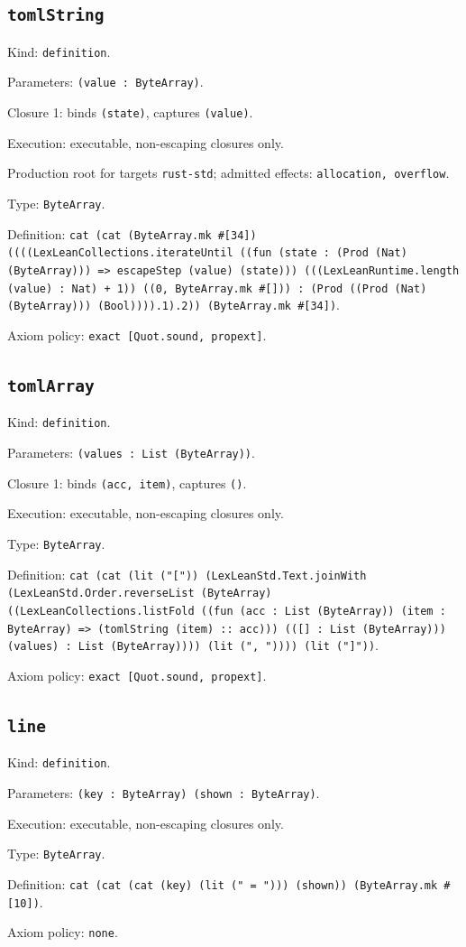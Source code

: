 \documentclass[11pt]{article}
\begin{document}
\subsection*{\texttt{tomlString}}
\noindent Kind: \texttt{definition}.\par
\noindent Parameters: \texttt{(value : ByteArray)}.\par
\noindent Closure 1: binds \texttt{(state)}, captures \texttt{(value)}.\par
\noindent Execution: executable, non-escaping closures only.\par
\noindent Production root for targets \texttt{rust-std}; admitted effects: \texttt{allocation, overflow}.\par
\noindent Type: \texttt{ByteArray}.\par
\noindent Definition: \texttt{cat (cat (ByteArray.mk \#[34]) ((((LexLeanCollections.iterateUntil ((fun (state : (Prod (Nat) (ByteArray))) => escapeStep (value) (state))) (((LexLeanRuntime.length (value) : Nat) + 1)) ((0, ByteArray.mk \#[])) : (Prod ((Prod (Nat) (ByteArray))) (Bool)))).1).2)) (ByteArray.mk \#[34])}.\par
\noindent Axiom policy: \texttt{exact [Quot.sound, propext]}.\par
\subsection*{\texttt{tomlArray}}
\noindent Kind: \texttt{definition}.\par
\noindent Parameters: \texttt{(values : List (ByteArray))}.\par
\noindent Closure 1: binds \texttt{(acc, item)}, captures \texttt{()}.\par
\noindent Execution: executable, non-escaping closures only.\par
\noindent Type: \texttt{ByteArray}.\par
\noindent Definition: \texttt{cat (cat (lit ("[")) (LexLeanStd.Text.joinWith (LexLeanStd.Order.reverseList (ByteArray) ((LexLeanCollections.listFold ((fun (acc : List (ByteArray)) (item : ByteArray) => (tomlString (item) :: acc))) (([] : List (ByteArray))) (values) : List (ByteArray)))) (lit (", ")))) (lit ("]"))}.\par
\noindent Axiom policy: \texttt{exact [Quot.sound, propext]}.\par
\subsection*{\texttt{line}}
\noindent Kind: \texttt{definition}.\par
\noindent Parameters: \texttt{(key : ByteArray) (shown : ByteArray)}.\par
\noindent Execution: executable, non-escaping closures only.\par
\noindent Type: \texttt{ByteArray}.\par
\noindent Definition: \texttt{cat (cat (cat (key) (lit (" = "))) (shown)) (ByteArray.mk \#[10])}.\par
\noindent Axiom policy: \texttt{none}.\par
\end{document}
